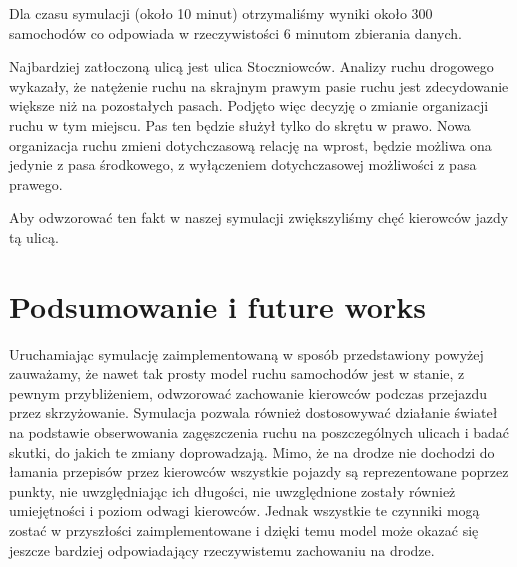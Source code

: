 \documentclass{sprawozdanie-agh}
\begin{document}
	Dla czasu symulacji (około 10 minut) otrzymaliśmy wyniki około 300 samochodów co odpowiada w rzeczywistości 6 minutom zbierania danych. 
	
	Najbardziej zatłoczoną ulicą jest ulica Stoczniowców. Analizy ruchu drogowego wykazały, że natężenie ruchu na skrajnym prawym pasie ruchu jest zdecydowanie większe niż na pozostałych pasach. Podjęto więc decyzję o zmianie organizacji ruchu w tym miejscu. Pas ten będzie służył tylko do skrętu w prawo. Nowa organizacja ruchu zmieni dotychczasową relację na wprost, będzie możliwa ona jedynie z pasa środkowego, z wyłączeniem dotychczasowej możliwości z pasa prawego.
	
	Aby odwzorować ten fakt w naszej symulacji zwiększyliśmy chęć kierowców jazdy tą ulicą.
	
	\section{Podsumowanie i future works}

	Uruchamiając symulację zaimplementowaną w sposób przedstawiony powyżej zauważamy, że nawet tak prosty model ruchu samochodów jest w stanie, z pewnym przybliżeniem, odwzorować zachowanie kierowców podczas przejazdu przez skrzyżowanie. Symulacja pozwala również dostosowywać działanie świateł na podstawie obserwowania zagęszczenia ruchu na poszczególnych ulicach i badać skutki, do jakich te zmiany doprowadzają. Mimo, że na drodze nie dochodzi do łamania przepisów przez kierowców wszystkie pojazdy są reprezentowane poprzez punkty, nie uwzględniając ich długości, nie uwzględnione zostały również umiejętności i poziom odwagi kierowców. Jednak wszystkie te czynniki mogą zostać w przyszłości zaimplementowane i dzięki temu model może okazać się jeszcze bardziej odpowiadający rzeczywistemu zachowaniu na drodze.
\end{document}
